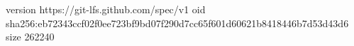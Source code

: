 version https://git-lfs.github.com/spec/v1
oid sha256:eb72343ccf02f0ee723bf9bd07f290d7cc65f601d60621b8418446b7d53d43d6
size 262240
